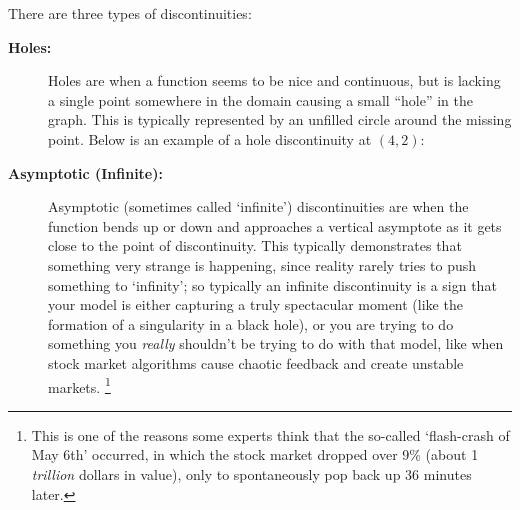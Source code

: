 \documentclass{ximera}
\begin{document}
    There are three types of discontinuities:
    \begin{description}
        \item[\textbf{Holes:}] Holes are when a function seems to be nice and continuous, but is lacking a single point somewhere in the domain causing a small ``hole'' in the graph. This is typically represented by an unfilled circle around the missing point. Below is an example of a hole discontinuity at $(4,2)$:
        \begin{center}
        \end{center}
        \item[\textbf{Asymptotic (Infinite):}] Asymptotic (sometimes called `infinite') discontinuities are when the function bends up or down and approaches a vertical asymptote as it gets close to the point of discontinuity. This typically demonstrates that something very strange is happening, since reality rarely tries to push something to `infinity'; so typically an infinite discontinuity is a sign that your model is either capturing a truly spectacular moment (like the formation of a singularity in a black hole), or you are trying to do something you \textit{really} shouldn't be trying to do with that model, like when stock market algorithms cause chaotic feedback and create unstable markets.%
            \footnote{%
                This is one of the reasons some experts think that the so-called `flash-crash of May 6th' occurred, in which the stock market dropped over 9\% (about 1 \textit{trillion} dollars in value), only to spontaneously pop back up 36 minutes later.%
}
\end{description}
\end{document}
